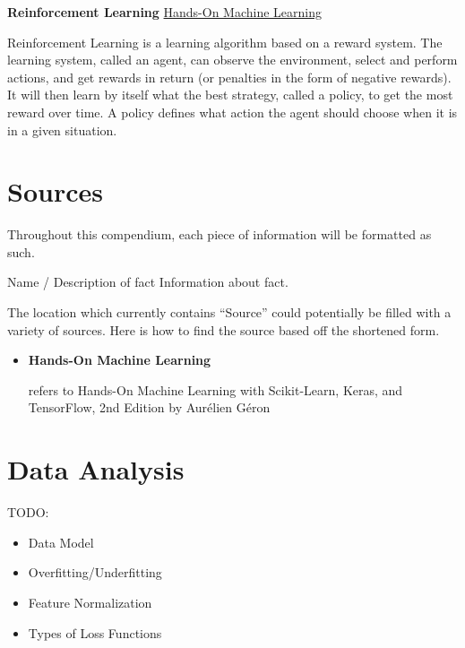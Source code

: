 \documentclass[12pt]{article}
\newcommand{\homl}{\hyperlink{homl}{Hands-On Machine Learning}}
\newenvironment{fact*}[2][]
    {
    \begin{adjustwidth}{1em}{0em}
    \noindent
    \textbf{#2} \hfill #1
    
    \vspace{0.1in}
    \noindent
    \ignorespaces
    }
    {
    \end{adjustwidth}
    }
\newenvironment{fact}[2][]
    {
    \index{#2}
    \hypertarget{#2}{\vspace{0.2in}}
    \begin{adjustwidth}{1em}{0em}
    \noindent
    \textbf{#2} \hfill #1
    
    \vspace{0.1in}
    \noindent
    \ignorespaces
    }
    {
    \end{adjustwidth}
    }
\begin{document}
    \begin{fact}[\homl]{Reinforcement Learning}
        Reinforcement Learning is a learning algorithm based on a reward system. The learning system, called an agent, can observe the environment,
        select and perform actions, and get rewards in return (or penalties in the form of negative rewards). It will then learn by itself what the 
        best strategy, called a policy, to get the most reward over time. A policy defines what action the agent should choose when it is in a given
        situation.
    \end{fact}

\newpage

\section*{Sources}
    Throughout this compendium, each piece of information will be formatted as such.
    
    \vspace{0.1in}
    \begin{fact*}[Source]{Name / Description of fact}
        Information about fact.
    \end{fact*}
    \vspace{0.3in}
    
    \noindent The location which currently contains ``Source'' could potentially be filled with a variety of sources. Here is how to find the source based off the shortened form.
    
    \begin{itemize}
        \item \hypertarget{homl}{\textbf{Hands-On Machine Learning}} refers to Hands-On Machine Learning with Scikit-Learn, Keras, and TensorFlow, 2nd Edition by Aurélien Géron
    \end{itemize}

\newpage

\section{Data Analysis}
TODO:
\begin{itemize}
    \item Data Model
    \item Overfitting/Underfitting
    \item Feature Normalization
    \item Types of Loss Functions
\end{itemize}
\end{document}

